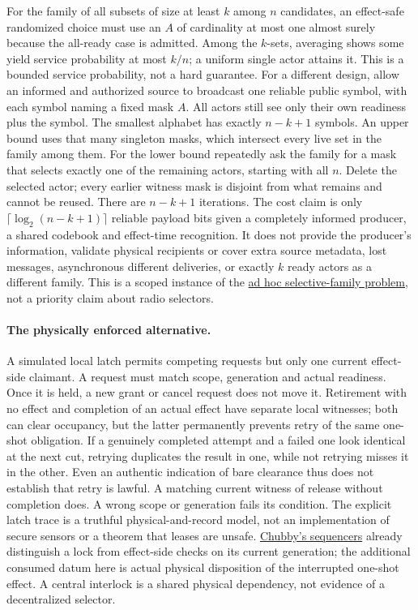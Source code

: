 \documentclass{article}
\begin{document}
For the family of all subsets of size at least $k$ among $n$ candidates, an effect-safe randomized choice must use an $A$ of cardinality at most one almost surely because the all-ready case is admitted. Among the $k$-sets, averaging shows some yield service probability at most $k/n$; a uniform single actor attains it. This is a bounded service probability, not a hard guarantee. For a different design, allow an informed and authorized source to broadcast one reliable public symbol, with each symbol naming a fixed mask $A$. All actors still see only their own readiness plus the symbol. The smallest alphabet has exactly $n-k+1$ symbols. An upper bound uses that many singleton masks, which intersect every live set in the family among them. For the lower bound repeatedly ask the family for a mask that selects exactly one of the remaining actors, starting with all $n$. Delete the selected actor; every earlier witness mask is disjoint from what remains and cannot be reused. There are $n-k+1$ iterations. The cost claim is only $\lceil\log_2(n-k+1)\rceil$ reliable payload bits given a completely informed producer, a shared codebook and effect-time recognition. It does not provide the producer's information, validate physical recipients or cover extra source metadata, lost messages, asynchronous different deliveries, or exactly $k$ ready actors as a different family. This is a scoped instance of the \href{https://citeseerx.ist.psu.edu/document?doi=1c4af6621d5ee28de304dca1bb8f27dd84a35de5&repid=rep1&type=pdf}{ad hoc selective-family problem}, not a priority claim about radio selectors.

\paragraph{The physically enforced alternative.}
A simulated local latch permits competing requests but only one current effect-side claimant. A request must match scope, generation and actual readiness. Once it is held, a new grant or cancel request does not move it. Retirement with no effect and completion of an actual effect have separate local witnesses; both can clear occupancy, but the latter permanently prevents retry of the same one-shot obligation. If a genuinely completed attempt and a failed one look identical at the next cut, retrying duplicates the result in one, while not retrying misses it in the other. Even an authentic indication of bare clearance thus does not establish that retry is lawful. A matching current witness of release without completion does. A wrong scope or generation fails its condition. The explicit latch trace is a truthful physical-and-record model, not an implementation of secure sensors or a theorem that leases are unsafe. \href{https://www.usenix.org/legacy/event/osdi06/tech/full_papers/burrows/burrows_html/index.html}{Chubby's sequencers} already distinguish a lock from effect-side checks on its current generation; the additional consumed datum here is actual physical disposition of the interrupted one-shot effect. A central interlock is a shared physical dependency, not evidence of a decentralized selector.
\end{document}
